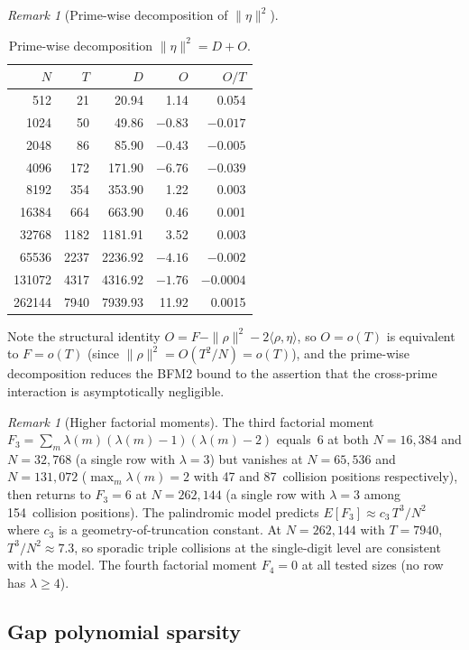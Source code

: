\documentclass[11pt]{article}
\theoremstyle{definition}
\theoremstyle{remark}
\newtheorem{remark}[theorem]{Remark}
\begin{document}
\begin{remark}[Prime-wise decomposition of $\|\eta\|^2$]
\begin{table}[ht]
\centering\small
\caption{Prime-wise decomposition
$\|\eta\|^2 = D + O$.}
\label{tab:prime-decomp}
\begin{tabular}{rrrrr}
\toprule
$N$ & $T$ & $D$ & $O$ & $O/T$ \\
\midrule
512 & 21 & 20.94 & 1.14 & 0.054 \\
1024 & 50 & 49.86 & $-0.83$ & $-0.017$ \\
2048 & 86 & 85.90 & $-0.43$ & $-0.005$ \\
4096 & 172 & 171.90 & $-6.76$ & $-0.039$ \\
8192 & 354 & 353.90 & 1.22 & 0.003 \\
16384 & 664 & 663.90 & 0.46 & 0.001 \\
32768 & 1182 & 1181.91 & 3.52 & 0.003 \\
65536 & 2237 & 2236.92 & $-4.16$ & $-0.002$ \\
131072 & 4317 & 4316.92 & $-1.76$ & $-0.0004$ \\
262144 & 7940 & 7939.93 & 11.92 & 0.0015 \\
\bottomrule
\end{tabular}
\end{table}
Note the structural identity
$O = F - \|\rho\|^2 - 2\langle\rho,\eta\rangle$,
so $O = o(T)$ is equivalent to
$F = o(T)$ (since $\|\rho\|^2 = O(T^2/N)
= o(T)$),
and the prime-wise decomposition
reduces the BFM2 bound to the
assertion that the cross-prime
interaction is asymptotically
negligible.
\end{remark}

\begin{remark}[Higher factorial moments]
\label{rem:factorial-moments}
The third factorial moment
$F_3 = \sum_m \lambda(m)(\lambda(m){-}1)(\lambda(m){-}2)$
equals~$6$ at both $N = 16{,}384$ and $N = 32{,}768$
(a single row with $\lambda = 3$)
but vanishes at $N = 65{,}536$ and $N = 131{,}072$
($\max_m \lambda(m) = 2$ with
47 and 87~collision positions respectively),
then returns to $F_3 = 6$ at $N = 262{,}144$
(a single row with $\lambda = 3$
among 154~collision positions).
The palindromic model predicts
$E[F_3] \approx c_3\,T^3/N^2$
where $c_3$ is a geometry-of-truncation
constant.
At $N = 262{,}144$ with $T = 7940$,
$T^3/N^2 \approx 7.3$,
so sporadic triple collisions at
the single-digit level are consistent
with the model.
The fourth factorial moment
$F_4 = 0$ at all tested sizes
(no row has $\lambda \ge 4$).
\end{remark}

\subsection{Gap polynomial sparsity}
\end{document}
